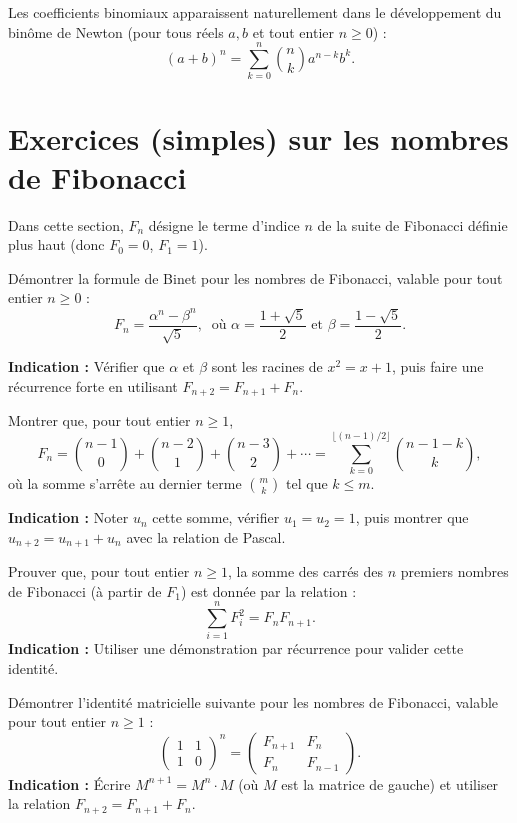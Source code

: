     Les coefficients binomiaux apparaissent naturellement dans le développement du binôme de Newton (pour tous réels \(a, b\) et tout entier \(n \geq 0\)) :
    \[
        (a + b)^n = \sum_{k=0}^n \binom{n}{k} a^{n-k} b^k.
    \]

\section*{Exercices (simples) sur les nombres de Fibonacci}
Dans cette section, \(F_n\) désigne le terme d'indice \(n\) de la suite de Fibonacci définie plus haut (donc \(F_0 = 0\), \(F_1 = 1\)).
\begin{exercise}
    Démontrer la formule de Binet pour les nombres de Fibonacci, valable pour tout entier \(n \geq 0\) :
    \[
        F_n = \frac{\alpha^n - \beta^n}{\sqrt{5}},\
        \text{ où } \alpha = \frac{1 + \sqrt{5}}{2} \text{ et } \beta = \frac{1 - \sqrt{5}}{2}.
    \]

    \textbf{Indication :} Vérifier que \(\alpha\) et \(\beta\) sont les racines de \(x^2 = x + 1\), puis faire une récurrence forte en utilisant \(F_{n+2} = F_{n+1} + F_n\).
\end{exercise}

\begin{exercise}
    Montrer que, pour tout entier \(n \geq 1\),
    \[
    F_n = \binom{n-1}{0} + \binom{n-2}{1} + \binom{n-3}{2} + \cdots = \sum_{k=0}^{\lfloor (n-1)/2 \rfloor} \binom{n-1-k}{k},
    \]
    où la somme s'arrête au dernier terme \(\binom{m}{k}\) tel que \(k \leq m\).

    \textbf{Indication :} Noter \(u_n\) cette somme, vérifier \(u_1 = u_2 = 1\), puis montrer que \(u_{n+2} = u_{n+1} + u_n\) avec la relation de Pascal.
\end{exercise}

\begin{exercise}
    Prouver que, pour tout entier \(n \geq 1\), la somme des carrés des \(n\) premiers nombres de Fibonacci (à partir de \(F_1\)) est donnée par la relation :
    \[
    \sum_{i=1}^n F_i^2 = F_n F_{n+1}.
    \]
    \textbf{Indication :} Utiliser une démonstration par récurrence pour valider cette identité.
\end{exercise}

\begin{exercise}
    Démontrer l'identité matricielle suivante pour les nombres de Fibonacci, valable pour tout entier \(n \geq 1\) :
    \[
    \begin{pmatrix}
    1 & 1 \\
    1 & 0
    \end{pmatrix}^n =
    \begin{pmatrix}
    F_{n+1} & F_n \\
    F_n & F_{n-1}
    \end{pmatrix}.
    \]
    \textbf{Indication :} Écrire \(M^{n+1} = M^n \cdot M\) (où \(M\) est la matrice de gauche) et utiliser la relation \(F_{n+2} = F_{n+1} + F_n\).
\end{exercise}

